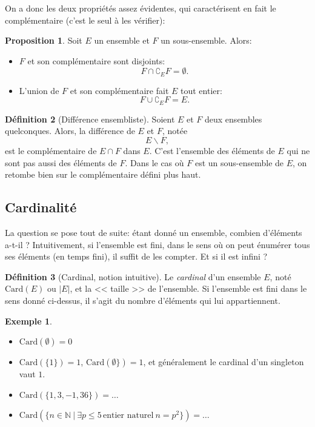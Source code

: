 \documentclass[11pt]{article}
\newcommand{\N}{\mathbb N}
\theoremstyle{definition}
\newtheorem{defn}{Définition}[section]
\newtheorem{prop}[defn]{Proposition}
\newtheorem{exe}{Exemple}
\theoremstyle{remark}
\begin{document}
On a donc les deux propriétés assez évidentes, qui caractérisent en fait le complémentaire (c'est le seul à les vérifier):

\begin{prop}
Soit $E$ un ensemble et $F$ un sous-ensemble. Alors:
\begin{itemize}
\item $F$ et son complémentaire sont disjoints:
\[F\cap \complement_E F = \emptyset. \]
\item L'union de $F$ et son complémentaire fait $E$ tout entier:
\[ F\cup\complement_E F = E. \]
\end{itemize}
\end{prop}

\begin{defn}[Différence ensembliste]
Soient $E$ et $F$ deux ensembles quelconques. Alors, la différence de $E$ et $F$, notée
\[ E\backslash F, \]
est le complémentaire de $E\cap F$ dans $E$. C'est l'ensemble des éléments de $E$ qui ne sont pas aussi des éléments de $F$. Dans le cas où $F$ est un sous-ensemble de $E$, on retombe bien sur le complémentaire défini plus haut.
\end{defn}

\subsection{Cardinalité}

La question se pose tout de suite: étant donné un ensemble, combien d'éléments a-t-il ? Intuitivement, si l'ensemble est fini, dans le sens où on peut énumérer tous ses éléments (en temps fini), il suffit de les compter. Et si il est infini ?

\begin{defn}[Cardinal, notion intuitive]
Le \textit{cardinal} d'un ensemble $E$, noté $\mathrm{Card}(E)$ ou $|E|$, et la << taille >> de l'ensemble. Si l'ensemble est fini dans le sens donné ci-dessus, il s'agit du nombre d'éléments qui lui appartiennent.
\end{defn}

\begin{exe}\leavevmode
\begin{itemize}
\item $\mathrm{Card}(\emptyset) = 0$
\item $\mathrm{Card}(\{1\}) = 1$, $\mathrm{Card}(\emptyset\}) = 1$, et généralement le cardinal d'un singleton vaut $1$.
\item $\mathrm{Card}(\{ 1,3,-1,36\}) = \ldots$
\item $\mathrm{Card}(\{ n\in\N\ |\ \exists p\leq 5\,\text{entier naturel}\ n=p^2\}) = \ldots$
\end{itemize}
\end{exe}
\end{document}
